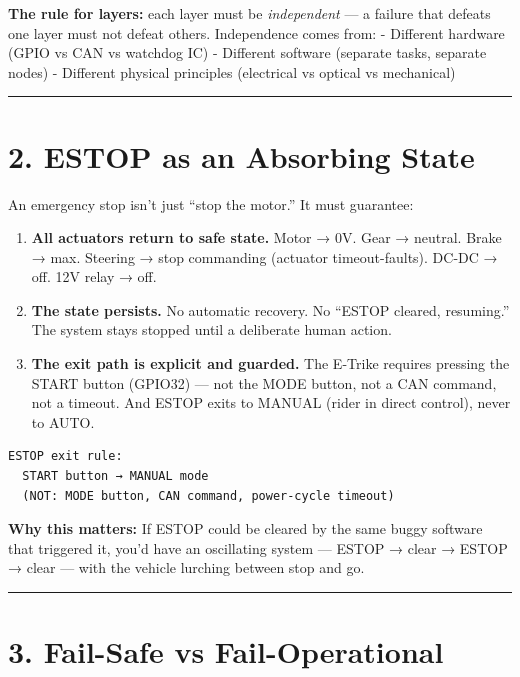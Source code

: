 \documentclass[12pt,a4paper,oneside]{report}
\providecommand{\tightlist}{\setlength{\itemsep}{0pt}\setlength{\parskip}{0pt}}
\begin{document}
\textbf{The rule for layers:} each layer must be \emph{independent} --- a
failure that defeats one layer must not defeat others. Independence comes from:
- Different hardware (GPIO vs CAN vs watchdog IC) - Different software (separate
tasks, separate nodes) - Different physical principles (electrical vs optical vs
mechanical)

\begin{center}\rule{0.5\linewidth}{0.5pt}\end{center}

\section{2. ESTOP as an Absorbing State}\label{estop-as-an-absorbing-state}

An emergency stop isn't just ``stop the motor.'' It must guarantee:

\begin{enumerate}
\def\labelenumi{\arabic{enumi}.}
\tightlist
\item
  \textbf{All actuators return to safe state.} Motor → 0V. Gear → neutral. Brake
  → max. Steering → stop commanding (actuator timeout-faults). DC-DC → off. 12V
  relay → off.
\item
  \textbf{The state persists.} No automatic recovery. No ``ESTOP cleared,
  resuming.'' The system stays stopped until a deliberate human action.
\item
  \textbf{The exit path is explicit and guarded.} The E-Trike requires pressing
  the START button (GPIO32) --- not the MODE button, not a CAN command, not a
  timeout. And ESTOP exits to MANUAL (rider in direct control), never to AUTO.
\end{enumerate}

\begin{verbatim}
ESTOP exit rule:
  START button → MANUAL mode
  (NOT: MODE button, CAN command, power-cycle timeout)
\end{verbatim}

\textbf{Why this matters:} If ESTOP could be cleared by the same buggy software
that triggered it, you'd have an oscillating system --- ESTOP → clear → ESTOP →
clear --- with the vehicle lurching between stop and go.

\begin{center}\rule{0.5\linewidth}{0.5pt}\end{center}

\section{3. Fail-Safe vs Fail-Operational}\label{fail-safe-vs-fail-operational}
\end{document}
